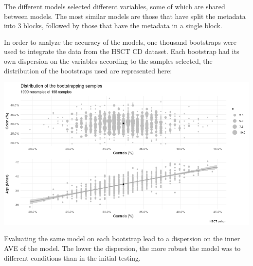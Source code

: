 \documentclass[
  a4paper,
]{book}
\let\origfigure\figure
\let\endorigfigure\endfigure
\renewenvironment{figure}[1][2] {
    \expandafter\origfigure\expandafter[!ht]
} {
    \endorigfigure
}
\begin{document}
The different models selected different variables, some of which are shared between models.
The most similar models are those that have split the metadata into 3 blocks, followed by those that have the metadata in a single block.

In order to analyze the accuracy of the models, one thousand bootstraps were used to integrate the data from the HSCT CD dataset.
Each bootstrap had its own dispersion on the variables according to the samples selected, the distribution of the bootstraps used are represented here:

\begin{figure}
\centering
\includegraphics{images/hsct-bootstrap-characteristics.png}
\caption{\label{fig:hsct-bootstrap-quality} Dispersion of the bootstraped samples on age and percentage of colon and controls samples.}
\end{figure}

Evaluating the same model on each bootstrap lead to a dispersion on the inner AVE of the model.
The lower the dispersion, the more robust the model was to different conditions than in the initial testing.
\end{document}
